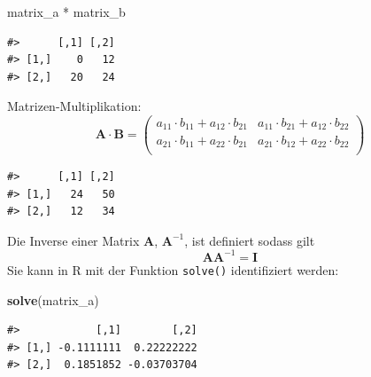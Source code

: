 \documentclass[]{tufte-book}
\newenvironment{Shaded}{}{}
\newcommand{\KeywordTok}[1]{\textcolor[rgb]{0.00,0.44,0.13}{\textbf{#1}}}
\newcommand{\StringTok}[1]{\textcolor[rgb]{0.25,0.44,0.63}{#1}}
\newcommand{\OperatorTok}[1]{\textcolor[rgb]{0.40,0.40,0.40}{#1}}
\newcommand{\NormalTok}[1]{#1}
\begin{document}
\begin{Shaded}
\begin{Highlighting}[]
\NormalTok{matrix_a }\OperatorTok{*}\StringTok{ }\NormalTok{matrix_b}
\end{Highlighting}
\end{Shaded}

\begin{verbatim}
#>      [,1] [,2]
#> [1,]    0   12
#> [2,]   20   24
\end{verbatim}

Matrizen-Multiplikation: \[\boldsymbol{A}\cdot\boldsymbol{B}=
\left(
\begin{array}{rrr}                                
a_{11}\cdot b_{11} + a_{12}\cdot b_{21} & a_{11}\cdot b_{21}+a_{12}\cdot b_{22}\\                     a_{21}\cdot b_{11} + a_{22}\cdot b_{21} & a_{21}\cdot b_{12}+a_{22}\cdot b_{22}\\                     
\end{array}
\right)
\]

\begin{Shaded}
\end{Shaded}

\begin{verbatim}
#>      [,1] [,2]
#> [1,]   24   50
#> [2,]   12   34
\end{verbatim}

Die Inverse einer Matrix \(\boldsymbol{A}\), \(\boldsymbol{A}^{-1}\),
ist definiert sodass gilt
\[\boldsymbol{A}\boldsymbol{A}^{-1}=\boldsymbol{I}\] Sie kann in R mit
der Funktion \texttt{solve()} identifiziert werden:

\begin{Shaded}
\begin{Highlighting}[]
\KeywordTok{solve}\NormalTok{(matrix_a)}
\end{Highlighting}
\end{Shaded}

\begin{verbatim}
#>            [,1]        [,2]
#> [1,] -0.1111111  0.22222222
#> [2,]  0.1851852 -0.03703704
\end{verbatim}

\begin{Shaded}
\end{Shaded}
\end{document}
